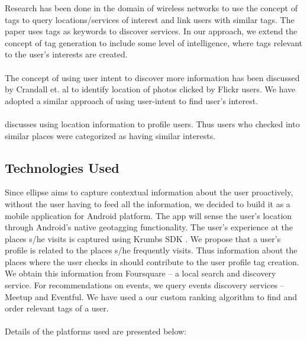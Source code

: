 \documentclass[12pt,letterpaper]{article}
\begin{document}
Research has been done in the domain of wireless networks to use the concept of tags to query locations/services of interest and link users with similar tags\cite{patent}. The paper uses tags as keywords to discover services. In our approach, we extend the concept of tag generation to include some level of intelligence, where tags relevant to the user’s interests are created.
\\\\
The concept of using user intent to discover more information has been discussed by Crandall et. al \cite{mapphotos} to identify location of photos clicked by Flickr users. We have adopted a similar approach of using user-intent to find user’s interest. 
\\\\
\cite{clusterfoursquare} discusses using location information to profile users. Thus users who checked into similar places were categorized as having similar interests.

\subsection{Technologies Used}
Since ellipse aims to capture contextual information about the user proactively, without the user having to feed all the information, we decided to build it as a mobile application for Android platform. The app will sense the user’s location through Android’s native geotagging functionality. The user’s experience at the places s/he visits is captured using Krumbs SDK \cite{krumbs}. We propose that a user’s profile is related to the places s/he frequently visits. Thus information about the places where the user checks in should contribute to the user profile tag creation. We obtain this information from Foursquare -- a local search and discovery service. For recommendations on events, we query events discovery services -- Meetup and Eventful. We have used a our custom ranking algorithm to find and order relevant tags of a user.
\\\\
Details of the platforms used are presented below:
\end{document}
